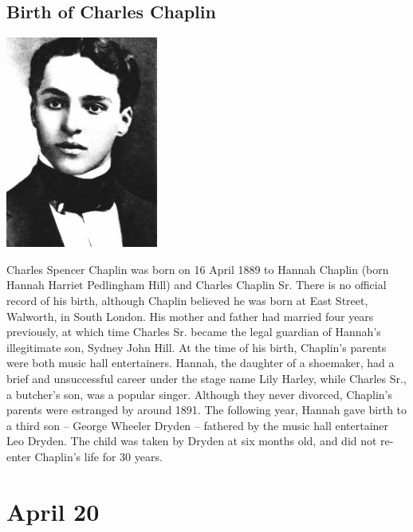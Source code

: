 \documentclass[11pt]{report}
\begin{document}
\subsection{Birth of Charles Chaplin}
\vspace{2mm}\begin{center}\includegraphics[width=5cm]{./img/youngchaplin.jpg}\end{center}
Charles Spencer Chaplin was born on 16 April 1889 to Hannah Chaplin (born Hannah Harriet Pedlingham Hill) and Charles Chaplin Sr. There is no official record of his birth, although Chaplin believed he was born at East Street, Walworth, in South London. His mother and father had married four years previously, at which time Charles Sr. became the legal guardian of Hannah's illegitimate son, Sydney John Hill. At the time of his birth, Chaplin's parents were both music hall entertainers. Hannah, the daughter of a shoemaker, had a brief and unsuccessful career under the stage name Lily Harley, while Charles Sr., a butcher's son, was a popular singer. Although they never divorced, Chaplin's parents were estranged by around 1891. The following year, Hannah gave birth to a third son – George Wheeler Dryden – fathered by the music hall entertainer Leo Dryden. The child was taken by Dryden at six months old, and did not re-enter Chaplin's life for 30 years.
\section{April 20}
\end{document}
